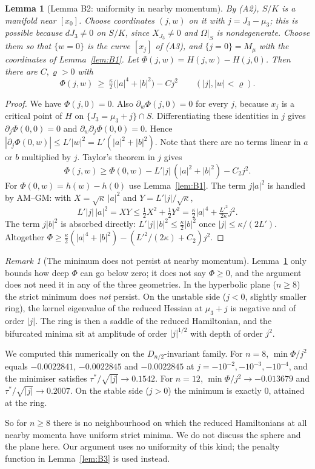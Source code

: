 \documentclass[11pt]{article}
\newtheorem{lemma}[theorem]{Lemma}
\theoremstyle{definition}
\theoremstyle{remark}
\newtheorem{remark}[theorem]{Remark}
\begin{document}
\begin{lemma}[Lemma B2: uniformity in nearby momentum]\label{lem:B2}
By (A2), $S/K$ is a manifold near $[x_0]$. Choose coordinates $(j,w)$ on it with $j=J_3-\mu_3$; this is
possible because $dJ_3\ne0$ on $S/K$, since $X_{J_3}\ne0$ and $\Omega|_S$ is nondegenerate. Choose them so
that $\{w=0\}$ is the curve $[x_j]$ of (A3), and $\{j=0\}=M_\mu$ with the coordinates of
Lemma~\ref{lem:B1}. Let $\Phi(j,w)=H(j,w)-H(j,0)$. Then there are $C,\varrho>0$ with
\[
\Phi(j,w)\ \ge\ \tfrac\kappa2\big(|a|^4+|b|^2\big)-Cj^2\qquad(|j|,|w|<\varrho).
\]
\end{lemma}

\begin{proof}
We have $\Phi(j,0)=0$. Also $\partial_w\Phi(j,0)=0$ for every $j$, because $x_j$ is a critical point of
$H$ on $\{J_3=\mu_3+j\}\cap S$. Differentiating these identities in $j$ gives $\partial_j\Phi(0,0)=0$ and
$\partial_w\partial_j\Phi(0,0)=0$. Hence $|\partial_j\Phi(0,w)|\le L'|w|^2=L'(|a|^2+|b|^2)$. Note that
there are no terms linear in $a$ or $b$ multiplied by $j$. Taylor's theorem in $j$ gives
\[
\Phi(j,w)\ge\Phi(0,w)-L'|j|\,(|a|^2+|b|^2)-C_2j^2 .
\]
For $\Phi(0,w)=h(w)-h(0)$ use Lemma~\ref{lem:B1}. The term $j|a|^2$ is handled by AM--GM: with
$X=\sqrt\kappa\,|a|^2$ and $Y=L'|j|/\sqrt\kappa$,
\[
L'|j|\,|a|^2=XY\le\tfrac12X^2+\tfrac12Y^2=\tfrac\kappa2|a|^4+\tfrac{L'^2}{2\kappa}j^2 .
\]
The term $j|b|^2$ is absorbed directly: $L'|j|\,|b|^2\le\tfrac\kappa2|b|^2$ once $|j|\le\kappa/(2L')$.
Altogether $\Phi\ge\tfrac\kappa2(|a|^4+|b|^2)-(L'^2/(2\kappa)+C_2)j^2$.
\end{proof}

\begin{remark}[The minimum does not persist at nearby momentum]\label{rem:nonpersist}
Lemma~\ref{lem:B2} only bounds how deep $\Phi$ can go below zero; it does not say $\Phi\ge0$, and the
argument does not need it in any of the three geometries. In the hyperbolic plane ($n\ge8$) the strict
minimum does \emph{not} persist. On the unstable side ($j<0$, slightly smaller ring), the kernel
eigenvalue of the reduced Hessian at $\mu_3+j$ is negative and of order $|j|$. The ring is then a saddle of
the reduced Hamiltonian, and the bifurcated minima sit at amplitude of order $|j|^{1/2}$ with depth of
order $j^2$.

We computed this numerically on the $D_{n/2}$-invariant family. For $n=8$, $\min\Phi/j^2$ equals
$-0.0022841$, $-0.0022845$ and $-0.0022845$ at $j=-10^{-2},-10^{-3},-10^{-4}$, and the minimiser satisfies
$\tau^*/\sqrt{|j|}\to0.1542$. For $n=12$, $\min\Phi/j^2\to-0.013679$ and $\tau^*/\sqrt{|j|}\to0.2007$. On
the stable side ($j>0$) the minimum is exactly $0$, attained at the ring.

So for $n\ge8$ there is no neighbourhood on which the reduced Hamiltonians at all nearby momenta have
uniform strict minima. We do not discuss the sphere and the plane here. Our argument uses no uniformity of
this kind; the penalty function in Lemma~\ref{lem:B3} is used instead.
\end{remark}
\end{document}
